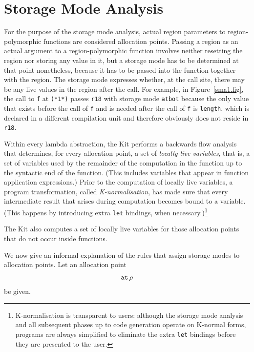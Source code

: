 \documentclass[12pt]{book}
\begin{document}
\section{Storage Mode Analysis}
\label{sma.sec}
For the purpose of the storage mode analysis, actual region
parameters to region-polymorphic functions are considered allocation
points. Passing a region as an actual argument to a region-polymorphic
function involves neither resetting the region nor storing any value
in it, but a storage mode has to be determined at that point
nonetheless, because it has to be passed into the function together with
the region. The storage mode expresses whether, at the call site,
there may be any live values in the region after the call. For
example, in Figure~\ref{sma1.fig}, the call to {\tt f}
at {\tt (*1*)} passes {\tt r18} with storage
mode {\tt atbot} because the only value that exists before the call
of {\tt f} and is needed after the call of {\tt f} is {\tt length},
which is declared in a different compilation unit and therefore
obviously does not reside in {\tt r18}.

Within every lambda abstraction, the Kit performs a backwards flow
analysis that determines, for every allocation point, a set of
%
{\em locally live variables}, that is, a set of variables used by the
remainder of the computation in the function up to the syntactic end
of the function. (This includes variables that appear in function
application expressions.) Prior to the computation of locally live
variables, a program transformation, called
\label{K-normal-form}{\em K-normalisation}, has
made sure that every intermediate result that arises during
computation becomes bound to a variable. (This happens by introducing
extra {\tt let} bindings, when necessary.)\footnote{K-normalisation is
  transparent to users: although the storage mode analysis and all
  subsequent phases up to code generation operate on K-normal forms,
  programs are always simplified to eliminate the extra {\tt let}
  bindings before they are presented to the user.}

The Kit also computes a set of locally live variables for those
allocation points that do not occur inside functions.

We now give an informal explanation of the rules that assign
storage modes to allocation points.
Let an allocation point
\begin{equation}
\label{allocpoint}\mathbin{\hbox{\tt at}}\,\rho
\end{equation}
be given. 
\bigskip
\end{document}
